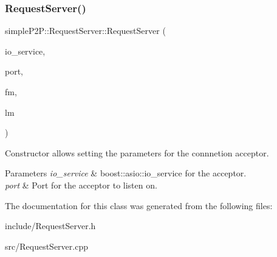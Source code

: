 \subsubsection{\texorpdfstring{Request\+Server()}{RequestServer()}}
{\footnotesize\ttfamily simple\+P2\+P\+::\+Request\+Server\+::\+Request\+Server (\begin{DoxyParamCaption}\item[{boost\+::asio\+::io\+\_\+service \&}]{io\+\_\+service,  }\item[{Uint16}]{port,  }\item[{\hyperlink{classsimpleP2P_1_1FileManager}{File\+Manager} \&}]{fm,  }\item[{\hyperlink{classsimpleP2P_1_1LoggingModule}{Logging\+Module} \&}]{lm }\end{DoxyParamCaption})}



Constructor allows setting the parameters for the connnetion acceptor. 


\begin{DoxyParams}{Parameters}
{\em io\+\_\+service} & boost\+::asio\+::io\+\_\+service for the acceptor. \\
\hline
{\em port} & Port for the acceptor to listen on. \\
\hline
\end{DoxyParams}


The documentation for this class was generated from the following files\+:\begin{DoxyCompactItemize}
\item 
include/Request\+Server.\+h\item 
src/Request\+Server.\+cpp\end{DoxyCompactItemize}
